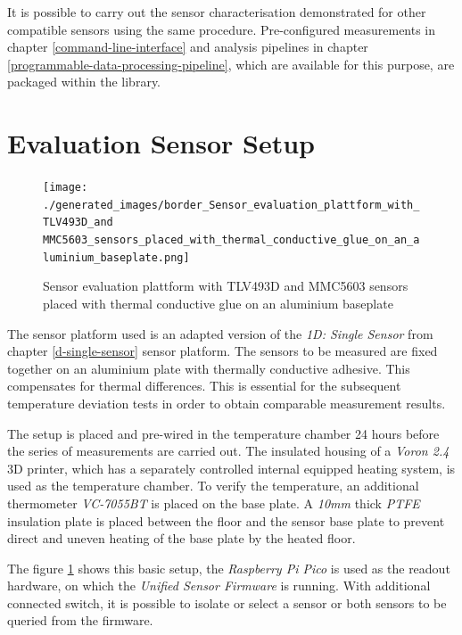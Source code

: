 It is possible to carry out the sensor characterisation demonstrated for
other compatible sensors using the same procedure. Pre-configured
measurements in chapter \ref{command-line-interface} and analysis
pipelines in chapter \ref{programmable-data-processing-pipeline}, which
are available for this purpose, are packaged within the library.

\hypertarget{evaluation-sensor-setup}{%
\section{Evaluation Sensor Setup}\label{evaluation-sensor-setup}}

\begin{figure}
\centering
\texttt{[image: ./generated\_images/border\_Sensor\_evaluation\_plattform\_with\_TLV493D\_and MMC5603\_sensors\_placed\_with\_thermal\_conductive\_glue\_on\_an\_aluminium\_baseplate.png]}
\caption{Sensor evaluation plattform with TLV493D and MMC5603 sensors
placed with thermal conductive glue on an aluminium baseplate
\label{Sensor_evaluation_plattform_with_TLV493D_and MMC5603_sensors_placed_with_thermal_conductive_glue_on_an_aluminium_baseplate.png}}
\end{figure}

The sensor platform used is an adapted version of the \emph{1D: Single
Sensor} from chapter \ref{d-single-sensor} sensor platform. The sensors
to be measured are fixed together on an aluminium plate with thermally
conductive adhesive. This compensates for thermal differences. This is
essential for the subsequent temperature deviation tests in order to
obtain comparable measurement results.

The setup is placed and pre-wired in the temperature chamber 24 hours
before the series of measurements are carried out. The insulated housing
of a \emph{Voron 2.4} 3D printer, which has a separately controlled
internal equipped heating system, is used as the temperature chamber. To
verify the temperature, an additional thermometer \emph{VC-7055BT} is
placed on the base plate. A \emph{10mm} thick \emph{PTFE} insulation
plate is placed between the floor and the sensor base plate to prevent
direct and uneven heating of the base plate by the heated floor.

The figure
\ref{Sensor_evaluation_plattform_with_TLV493D_and MMC5603_sensors_placed_with_thermal_conductive_glue_on_an_aluminium_baseplate.png}
shows this basic setup, the \emph{Raspberry Pi Pico} is used as the
readout hardware, on which the \emph{Unified Sensor Firmware} is
running. With additional connected switch, it is possible to isolate or
select a sensor or both sensors to be queried from the firmware.

